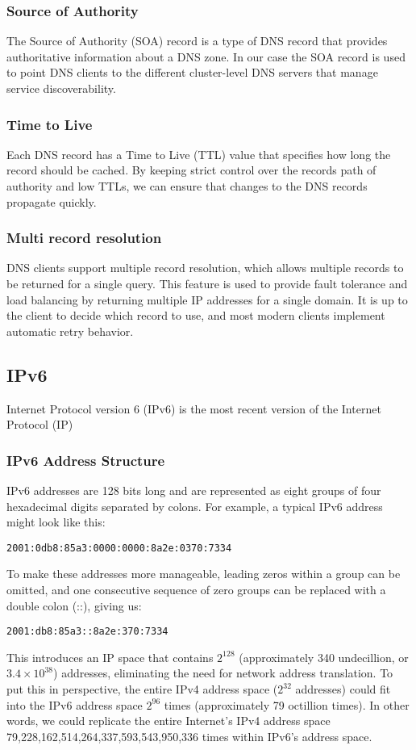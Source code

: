\documentclass[12pt]{article}
\begin{document}
\subsubsection{Source of Authority}
The Source of Authority (SOA) record is a type of DNS record that provides authoritative information about a DNS zone.
In our case the SOA record is used to point DNS clients to the different cluster-level DNS servers that manage service discoverability.

\subsubsection{Time to Live}
Each DNS record has a Time to Live (TTL) value that specifies how long the record should be cached.
By keeping strict control over the records path of authority and low TTLs, we can ensure that changes to the DNS records propagate quickly.

\subsubsection{Multi record resolution}
DNS clients support multiple record resolution, which allows multiple records to be returned for a single query.
This feature is used to provide fault tolerance and load balancing by returning multiple IP addresses for a single domain.
It is up to the client to decide which record to use, and most modern clients implement automatic retry behavior.

\subsection{IPv6}
Internet Protocol version 6 (IPv6)\cite{hindenInternetProtocolVersion1998} is the most recent version of the Internet Protocol (IP)
\subsubsection{IPv6 Address Structure}
IPv6 addresses are 128 bits long and are represented as eight groups of four hexadecimal digits separated by colons.
For example, a typical IPv6 address might look like this:
\begin{verbatim}
2001:0db8:85a3:0000:0000:8a2e:0370:7334
\end{verbatim}
To make these addresses more manageable, leading zeros within a group can be omitted, 
and one consecutive sequence of zero groups can be replaced with a double colon (::), giving us:
\begin{verbatim}
2001:db8:85a3::8a2e:370:7334
\end{verbatim}
This introduces an IP space that contains $2^{128}$ (approximately 340 undecillion, or $3.4 \times 10^{38}$) addresses, 
eliminating the need for network address translation. 
To put this in perspective, the entire IPv4 address space ($2^{32}$ addresses) could fit into the IPv6 address space $2^{96}$ times 
(approximately 79 octillion times).
In other words, we could replicate the entire Internet's IPv4 address space 79,228,162,514,264,337,593,543,950,336 times within IPv6's address space.
\end{document}
